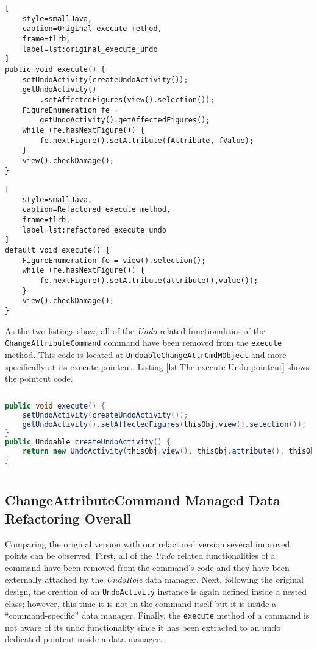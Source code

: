 \noindent\begin{minipage}{.45\textwidth}
\begin{lstlisting}[
	style=smallJava,
	caption=Original execute method,
	frame=tlrb,
	label=lst:original_execute_undo
]
public void execute() {
	setUndoActivity(createUndoActivity());
	getUndoActivity()
		.setAffectedFigures(view().selection());
	FigureEnumeration fe = 
	  	getUndoActivity().getAffectedFigures();
	while (fe.hasNextFigure()) {
		fe.nextFigure().setAttribute(fAttribute, fValue);
	}
	view().checkDamage();
}
\end{lstlisting}
\end{minipage}\hfill
\begin{minipage}{.45\textwidth}
\begin{lstlisting}[
	style=smallJava,
	caption=Refactored execute method,
	frame=tlrb,
	label=lst:refactored_execute_undo
]
default void execute() {
	FigureEnumeration fe = view().selection();
	while (fe.hasNextFigure()) {
		fe.nextFigure().setAttribute(attribute(),value());
	}
	view().checkDamage();
}
	\end{lstlisting}
\label{lst:execute_undo}
\end{minipage}

As the two listings show, all of the \textit{Undo} related functionalities of the \texttt{ChangeAttributeCommand} command have been removed from the \texttt{execute} method.
This code is located at \texttt{UndoableChangeAttrCmdMObject} and more specifically at its execute pointcut.
Listing \ref{lst:The execute Undo pointcut} shows the pointcut code.

\begin{sourcecode}
	\begin{lstlisting}[language=Java]
public void execute() {
	setUndoActivity(createUndoActivity());
	getUndoActivity().setAffectedFigures(thisObj.view().selection());
}
public Undoable createUndoActivity() {
	return new UndoActivity(thisObj.view(), thisObj.attribute(), thisObj.value());
}
    \end{lstlisting}
	\caption{The execute Undo pointcut}
	\label{lst:The execute Undo pointcut}
\end{sourcecode}

\subsection{ChangeAttributeCommand Managed Data Refactoring Overall}
Comparing the original version with our refactored version several improved points can be observed.
First, all of the \textit{Undo} related functionalities of a command have been removed from the command's code and they have been externally attached by the \textit{UndoRole} data manager.
Next, following the original design, the creation of an \texttt{UndoActivity} instance is again defined inside a nested class; however, this time it is not in the command itself but it is inside a ``command-specific'' data manager.
Finally, the \texttt{execute} method of a command is not aware of its undo functionality since it has been extracted to an undo dedicated pointcut inside a data manager.


